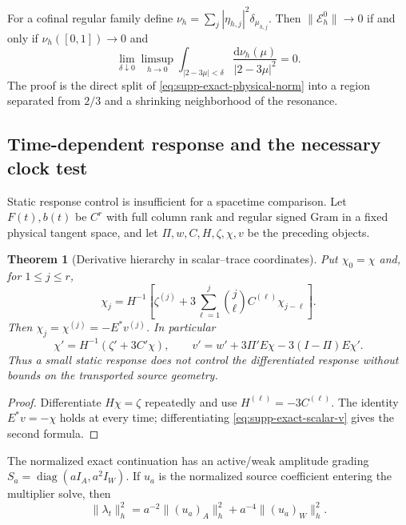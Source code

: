 \documentclass[11pt]{article}
\newtheorem{theorem}{Theorem}[section]
\theoremstyle{definition}
\theoremstyle{remark}
\newcommand{\dd}{\mathrm d}
\begin{document}
For a cofinal regular family define
$\nu_h=\sum_j|\eta_{h,j}|^2\delta_{\mu_{h,j}}$.  Then
$\|\mathcal E_h^0\|\to0$ if and only if
$\nu_h([0,1])\to0$ and
\begin{equation}
 \lim_{\delta\downarrow0}\limsup_{h\to0}
 \int_{|2-3\mu|<\delta}\frac{\dd\nu_h(\mu)}{|2-3\mu|^2}=0.
 \label{eq:supp-exact-resonance-ui}
\end{equation}
The proof is the direct split of \eqref{eq:supp-exact-physical-norm} into a
region separated from $2/3$ and a shrinking neighborhood of the resonance.

\subsection{Time-dependent response and the necessary clock test}

Static response control is insufficient for a spacetime comparison.  Let
$F(t),b(t)$ be $C^r$ with full column rank and regular signed Gram in a fixed
physical tangent space, and let $\Pi,w,C,H,\zeta,\chi,v$ be the preceding
objects.

\begin{theorem}[Derivative hierarchy in scalar--trace coordinates]
\label{thm:supp-exact-time-hierarchy}
Put $\chi_0=\chi$ and, for $1\le j\le r$,
\begin{equation}
 \boxed{\chi_j=H^{-1}\left[\zeta^{(j)}+
 3\sum_{\ell=1}^j\binom j\ell C^{(\ell)}\chi_{j-\ell}\right].}
 \label{eq:supp-exact-time-sources}
\end{equation}
Then $\chi_j=\chi^{(j)}=-E^*v^{(j)}$.  In particular
\begin{equation}
 \chi'=H^{-1}(\zeta'+3C'\chi),\qquad
 v'=w'+3\Pi'E\chi-3(I-\Pi)E\chi'.
 \label{eq:supp-exact-first-time-source}
\end{equation}
Thus a small static response does not control the differentiated response
without bounds on the transported source geometry.
\end{theorem}
\begin{proof}
Differentiate $H\chi=\zeta$ repeatedly and use $H^{(\ell)}=-3C^{(\ell)}$.
The identity $E^*v=-\chi$ holds at every time; differentiating
\eqref{eq:supp-exact-scalar-v} gives the second formula.
\end{proof}

The normalized exact continuation has an active/weak amplitude grading
$S_a=\operatorname{diag}(aI_A,a^2I_W)$.  If $u_a$ is the normalized source
coefficient entering the multiplier solve, then
\begin{equation}
 \|\lambda_t\|_h^2=a^{-2}\|(u_a)_A\|_h^2
                    +a^{-4}\|(u_a)_W\|_h^2.
 \label{eq:supp-exact-rate-norm}
\end{equation}
\end{document}
